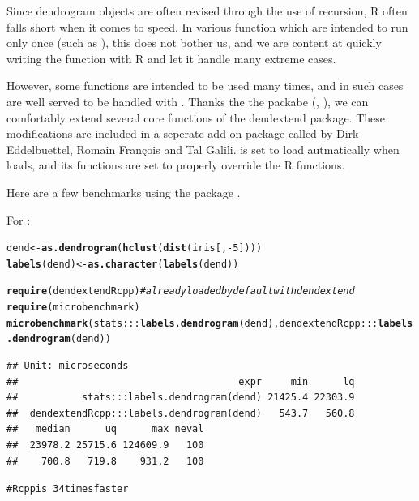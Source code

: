 \documentclass[shortnames,nojss,article]{jss}\usepackage[]{graphicx}\usepackage[]{color}
\makeatletter
\newcommand{\hlnum}[1]{\textcolor[rgb]{0.686,0.059,0.569}{#1}}%
\newcommand{\hlcom}[1]{\textcolor[rgb]{0.678,0.584,0.686}{\textit{#1}}}%
\newcommand{\hlopt}[1]{\textcolor[rgb]{0,0,0}{#1}}%
\newcommand{\hlstd}[1]{\textcolor[rgb]{0.345,0.345,0.345}{#1}}%
\newcommand{\hlkwb}[1]{\textcolor[rgb]{0.69,0.353,0.396}{#1}}%
\newcommand{\hlkwd}[1]{\textcolor[rgb]{0.737,0.353,0.396}{\textbf{#1}}}%
\newenvironment{kframe}{%
 \def\at@end@of@kframe{}%
 \ifinner\ifhmode%
  \def\at@end@of@kframe{\end{minipage}}%
  \begin{minipage}{\columnwidth}%
 \fi\fi%
 \def\FrameCommand##1{\hskip\@totalleftmargin \hskip-\fboxsep
 \colorbox{shadecolor}{##1}\hskip-\fboxsep
     \hskip-\linewidth \hskip-\@totalleftmargin \hskip\columnwidth}%
 \MakeFramed {\advance\hsize-\width
   \@totalleftmargin\z@ \linewidth\hsize
   \@setminipage}}%
 {\par\unskip\endMakeFramed%
 \at@end@of@kframe}
\newenvironment{knitrout}{}{} %
\makeatother
\begin{document}
Since dendrogram objects are often revised through the use of recursion, R often falls short when it comes to speed. In various function which are intended to run only once (such as ), this does not bother us, and we are content at quickly writing the function with R and let it handle many extreme cases.

However, some functions are intended to be used many times, and in such cases are well served to be handled with . Thanks the the  packabe (\cite{CRAN:Rcpp}, \cite{JSS:Rcpp}), we can comfortably extend several core functions of the dendextend package. These modifications are included in a seperate add-on package called  \citep{CRAN:dendextendRcpp} by Dirk Eddelbuettel, Romain Fran\c{c}ois and Tal Galili.  is set to load autmatically when  loads, and its functions are set to properly override the R functions.

Here are a few benchmarks using the  package \citep{CRAN:microbenchmark}.

For :

\begin{knitrout}
\color{fgcolor}\begin{kframe}
\begin{alltt}
\hlstd{dend} \hlkwb{<-} \hlkwd{as.dendrogram}\hlstd{(}\hlkwd{hclust}\hlstd{(}\hlkwd{dist}\hlstd{(iris[,} \hlopt{-}\hlnum{5}\hlstd{])))}
\hlkwd{labels}\hlstd{(dend)} \hlkwb{<-} \hlkwd{as.character}\hlstd{(}\hlkwd{labels}\hlstd{(dend)}\hlstd{)}

\hlkwd{require}\hlstd{(dendextendRcpp)}  \hlcom{# already loaded by default with dendextend}
\hlkwd{require}\hlstd{(microbenchmark)}
\hlkwd{microbenchmark}\hlstd{(stats:::}\hlkwd{labels.dendrogram}\hlstd{(dend), dendextendRcpp:::}\hlkwd{labels.dendrogram}\hlstd{(dend))}
\end{alltt}
\begin{verbatim}
## Unit: microseconds
##                                      expr     min      lq
##           stats:::labels.dendrogram(dend) 21425.4 22303.9
##  dendextendRcpp:::labels.dendrogram(dend)   543.7   560.8
##   median      uq      max neval
##  23978.2 25715.6 124609.9   100
##    700.8   719.8    931.2   100
\end{verbatim}
\begin{alltt}
# Rcpp is ~34 times faster
\end{alltt}
\end{kframe}
\end{knitrout}
\end{document}
